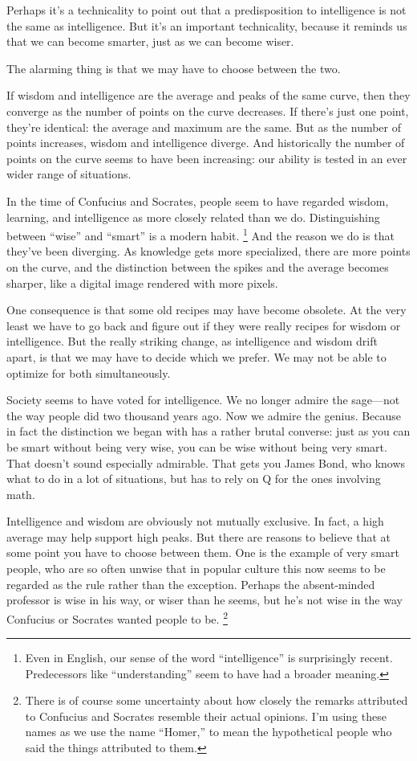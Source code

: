 Perhaps it's a technicality to point out that a predisposition to
intelligence is not the same as intelligence. But it's an important
technicality, because it reminds us that we can become smarter, just as
we can become wiser.

The alarming thing is that we may have to choose between the two.

If wisdom and intelligence are the average and peaks of the same curve,
then they converge as the number of points on the curve decreases. If
there's just one point, they're identical: the average and maximum are
the same. But as the number of points increases, wisdom and intelligence
diverge. And historically the number of points on the curve seems to
have been increasing: our ability is tested in an ever wider range of
situations.

In the time of Confucius and Socrates, people seem to have regarded
wisdom, learning, and intelligence as more closely related than we do.
Distinguishing between ``wise'' and ``smart'' is a modern habit.
\footnote{Even in English, our sense of the word ``intelligence'' is
surprisingly recent. Predecessors like ``understanding'' seem to have
had a broader meaning.} And the reason we do is that they've been
diverging. As knowledge gets more specialized, there are more points on
the curve, and the distinction between the spikes and the average
becomes sharper, like a digital image rendered with more pixels.

One consequence is that some old recipes may have become obsolete. At
the very least we have to go back and figure out if they were really
recipes for wisdom or intelligence. But the really striking change, as
intelligence and wisdom drift apart, is that we may have to decide which
we prefer. We may not be able to optimize for both simultaneously.

Society seems to have voted for intelligence. We no longer admire the
sage---not the way people did two thousand years ago. Now we admire the
genius. Because in fact the distinction we began with has a rather
brutal converse: just as you can be smart without being very wise, you
can be wise without being very smart. That doesn't sound especially
admirable. That gets you James Bond, who knows what to do in a lot of
situations, but has to rely on Q for the ones involving math.

Intelligence and wisdom are obviously not mutually exclusive. In fact, a
high average may help support high peaks. But there are reasons to
believe that at some point you have to choose between them. One is the
example of very smart people, who are so often unwise that in popular
culture this now seems to be regarded as the rule rather than the
exception. Perhaps the absent-minded professor is wise in his way, or
wiser than he seems, but he's not wise in the way Confucius or Socrates
wanted people to be. \footnote{There is of course some uncertainty about how closely the
remarks attributed to Confucius and Socrates resemble their actual
opinions. I'm using these names as we use the name ``Homer,'' to mean
the hypothetical people who said the things attributed to them.}

